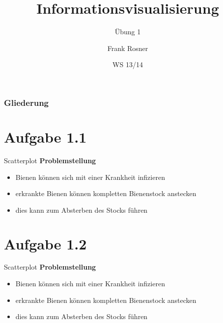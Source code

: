 \documentclass{beamer}
\title{Informationsvisualisierung}
\subtitle{Übung 1}
\author{
Frank Rosner
}
\institute{
Martin-Luther-Universität Halle-Wittenberg
}
\date{WS 13/14}
\begin{document}

\begin{frame}
\frametitle{Gliederung}
\tableofcontents
\end{frame}

\section{Aufgabe 1.1}

\begin{frame}{Scatterplot}
\textbf{Problemstellung}
\begin{itemize}
\item Bienen können sich mit einer Krankheit infizieren
\item erkrankte Bienen können kompletten Bienenstock anstecken
\item dies kann zum Absterben des Stocks führen
\end{itemize}
\end{frame}

\section{Aufgabe 1.2}

\begin{frame}{Scatterplot}
\textbf{Problemstellung}
\begin{itemize}
\item Bienen können sich mit einer Krankheit infizieren
\item erkrankte Bienen können kompletten Bienenstock anstecken
\item dies kann zum Absterben des Stocks führen
\end{itemize}
\end{frame}
\end{document}
